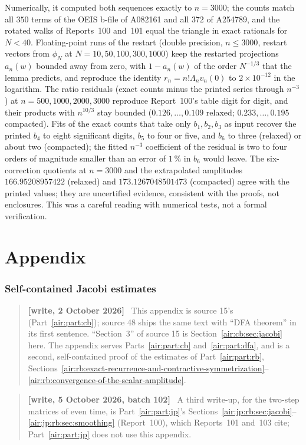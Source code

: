 \documentclass[11pt,letterpaper]{article}
\numberwithin{equation}{section}
\theoremstyle{remark}
\newenvironment{writenote}{\par\smallskip\begin{quote}\small\textbf{[write, 2 October 2026]}\ }{\end{quote}\smallskip}
\newenvironment{writenotejp}{\par\smallskip\begin{quote}\small\textbf{[write, 5 October 2026, batch 102]}\ }{\end{quote}\smallskip}
\begin{document}
Numerically, it computed both sequences exactly to $n=3000$; the counts match all $350$ terms of the OEIS b-file of A082161 and all $372$ of A254789, and the rotated walks of Reports~100 and~101 equal the triangle in exact rationals for $N<40$. Floating-point runs of the restart (double precision, $n\le3000$, restart vectors from $\phi_N$ at $N=10,50,100,300,1000$) keep the restarted projections $a_n(w)$ bounded away from zero, with $1-a_n(w)$ of the order $N^{-1/3}$ that the lemma predicts, and reproduce the identity $r_n=n!\Lambda_nv_n(0)$ to $2\times10^{-12}$ in the logarithm. The ratio residuals (exact counts minus the printed series through $n^{-3}$) at $n=500,1000,2000,3000$ reproduce Report~100's table digit for digit, and their products with $n^{10/3}$ stay bounded ($0.126,\ldots,0.109$ relaxed; $0.233,\ldots,0.195$ compacted). Fits of the exact counts that take only $b_1,b_2,b_3$ as input recover the printed $b_4$ to eight significant digits, $b_5$ to four or five, and $b_6$ to three (relaxed) or about two (compacted); the fitted $n^{-3}$ coefficient of the residual is two to four orders of magnitude smaller than an error of $1\,\%$ in $b_6$ would leave. The six-correction quotients at $n=3000$ and the extrapolated amplitudes $166.95208957422$ (relaxed) and $173.1267048501473$ (compacted) agree with the printed values; they are uncertified evidence, consistent with the proofs, not enclosures. This was a careful reading with numerical tests, not a formal verification.

\appendix
\part*{Appendix}

\section{Self-contained Jacobi estimates}\label{air:app:jacobi}
\begin{writenote}
This appendix is source 15's (Part~\ref{air:part:cb}); source 48 ships the same text with ``DFA theorem'' in its first sentence. ``Section~3'' of source 15 is Section~\ref{air:cb:sec:jacobi} here. The appendix serves Parts~\ref{air:part:cb} and~\ref{air:part:dfa}, and is a second, self-contained proof of the estimates of Part~\ref{air:part:rb}, Sections~\ref{air:rb:exact-recurrence-and-contractive-symmetrization}--\ref{air:rb:convergence-of-the-scalar-amplitude}.
\end{writenote}
\begin{writenotejp}
A third write-up, for the two-step matrices of even time, is Part~\ref{air:part:jp}'s Sections~\ref{air:jp:rb:sec:jacobi}--\ref{air:jp:rb:sec:smoothing} (Report~100), which Reports~101 and~103 cite; Part~\ref{air:part:jp} does not use this appendix.
\end{writenotejp}
\end{document}
